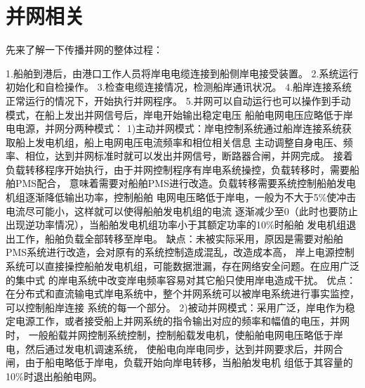 \chapter{并网相关}

先来了解一下传播并网的整体过程：

1.船舶到港后，由港口工作人员将岸电电缆连接到船侧岸电接受装置。
2.系统运行初始化和自检操作。
3.检查电缆连接情况，检测船岸通讯状况。
4.船岸连接系统正常运行的情况下，开始执行并网程序。
5.并网可以自动运行也可以操作到手动模式，在船上发出并网信号后，岸电开始输出稳定电压
船舶电网电压应略低于岸电电源，并网分两种模式：
1)主动并网模式：岸电控制系统通过船岸连接系统获取船上发电机组，船上电网电压电流频率和相位相关信息
               主动调整自身电压、频率、相位，达到并网标准时就可以发出并网信号，断路器合闸，并网完成。
               接着负载转移程序开始执行，由于并网控制程序有岸电系统操控，负载转移时，需要船舶PMS配合，
               意味着需要对船舶PMS进行改造。负载转移需要系统控制船舶发电机组逐渐降低输出功率，控制船舶
               电网电压略低于岸电，一般为不大于5\%使冲击电流尽可能小，这样就可以使得船舶发电机组的电流
               逐渐减少至0（此时也要防止出现逆功率情况），当船舶发电机组功率小于其额定功率的10\%时船舶
               发电机组退出工作，船舶负载全部转移至岸电。
               缺点：未被实际采用，原因是需要对船舶PMS系统进行改造，会对原有的系统控制造成混乱，改造成本高，
               岸上电源控制系统可以直接操控船舶发电机组，可能数据泄漏，存在网络安全问题。在应用广泛的集中式
               的岸电系统中改变岸电频率容易对其它船只使用岸电造成干扰。
               优点：在分布式和直流输电式岸电系统中，整个并网系统可以被岸电系统进行事实监控，可以控制船岸连接
               系统的每一个部分。
2)被动并网模式：采用广泛，岸电作为稳定电源工作，或者接受船上并网系统的指令输出对应的频率和幅值的电压，并网时，
               一般船载并网控制系统控制，控制船载发电机，使船舶电网电压略低于岸电，然后通过发电机调速系统，
               使船电向岸电同步，达到并网要求后，并网合闸，由于船电略低于岸电，负载开始向岸电转移，当船舶发电机
               组低于其容量的10\%时退出船舶电网。
               
               